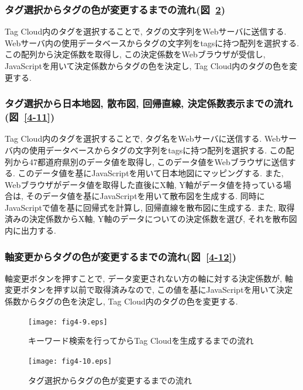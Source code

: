 \documentclass[sotsuron]{kuee}
\begin{document}
\subsubsection{タグ選択からタグの色が変更するまでの流れ(図~\ref{4-10})}

Tag Cloud内のタグを選択することで, タグの文字列をWebサーバに送信する. Webサーバ内の使用データベースからタグの文字列をtagsに持つ配列を選択する.
この配列から決定係数を取得し, この決定係数をWebブラウザが受信し, JavaScriptを用いて決定係数からタグの色を決定し, Tag Cloud内のタグの色を変更する.

\subsubsection{タグ選択から日本地図, 散布図, 回帰直線, 決定係数表示までの流れ(図~\ref{4-11})}

Tag Cloud内のタグを選択することで, タグ名をWebサーバに送信する.
Webサーバ内の使用データベースからタグの文字列をtagsに持つ配列を選択する.
この配列から47都道府県別のデータ値を取得し, このデータ値をWebブラウザに送信する.
このデータ値を基にJavaScriptを用いて日本地図にマッピングする. また, Webブラウザがデータ値を取得した直後にX軸, Y軸がデータ値を持っている場合は,
そのデータ値を基にJavaScriptを用いて散布図を生成する.
同時にJavaScriptで値を基に回帰式を計算し, 回帰直線を散布図に生成する. また, 取得済みの決定係数からX軸, Y軸のデータについての決定係数を選び, それを散布図内に出力する.

\subsubsection{軸変更からタグの色が変更するまでの流れ(図~\ref{4-12})}

軸変更ボタンを押すことで, データ変更されない方の軸に対する決定係数が,
軸変更ボタンを押す以前で取得済みなので, この値を基にJavaScriptを用いて決定係数からタグの色を決定し,
Tag Cloud内のタグの色を変更する.

\begin{figure}
  \begin{center}
    \unitlength=1mm
   \texttt{[image: fig4-9.eps]}
  \end{center}
  \caption{キーワード検索を行ってからTag Cloudを生成するまでの流れ}
  \label{4-9}
\end{figure}

\begin{figure}
  \begin{center}
    \unitlength=1mm
   \texttt{[image: fig4-10.eps]}
  \end{center}
  \caption{タグ選択からタグの色が変更するまでの流れ}
  \label{4-10}
\end{figure}
\end{document}
